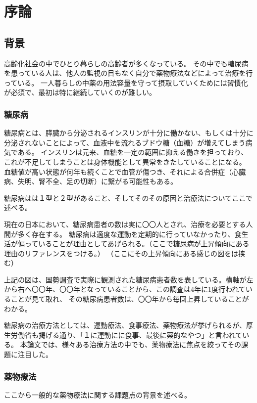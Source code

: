 \chapter{序論}
\label{chap:introduction}

\section{背景}
\label{section:background}
高齢化社会の中でひとり暮らしの高齢者が多くなっている。
その中でも糖尿病を患っている人は、他人の監視の目もなく自分で薬物療法などによって治療を行っている。
一人暮らしの中薬の用法容量を守って摂取していくためには習慣化が必須で、最初は特に継続していくのが難しい。

\subsection{糖尿病}
糖尿病とは、膵臓から分泌されるインスリンが十分に働かない、もしくは十分に分泌されないことによって、血液中を流れるブドウ糖（血糖）が増えてしまう病気である。
インスリンは元来、血糖を一定の範囲に抑える働きを担っており、これが不足してしまうことは身体機能として異常をきたしていることになる。
血糖値が高い状態が何年も続くことで血管が傷つき、それによる合併症（心臓病、失明、腎不全、足の切断）に繋がる可能性もある。

糖尿病はは１型と２型があること、そしてそのその原因と治療法についてここで述べる。

現在の日本において、糖尿病患者の数は実に〇〇人とされ、治療を必要とする人間が多く存在する。
糖尿病は適度な運動を定期的に行っていなかったり、食生活が偏っていることが理由としてあげられる。（ここで糖尿病が上昇傾向にある理由のリファレンスをつける。）
（ここにその上昇傾向にある感じの図をは挟む）

上記の図は、国勢調査で実際に観測された糖尿病患者数を表している。横軸が左から右へ〇〇年、〇〇年となっていることから、この調査は4年に1度行われていることが見て取れ、
その糖尿病患者数は、〇〇年から毎回上昇していることがわかる。

糖尿病の治療方法としては、運動療法、食事療法、薬物療法が挙げられるが、厚生労働省も掲げる通り、「１に運動にに食事、最後に薬的なやつ」と言われている。
本論文では、様々ある治療方法の中でも、薬物療法に焦点を絞ってその課題に注目した。

\subsection{薬物療法}

ここから一般的な薬物療法に関する課題点の背景を述べる。


